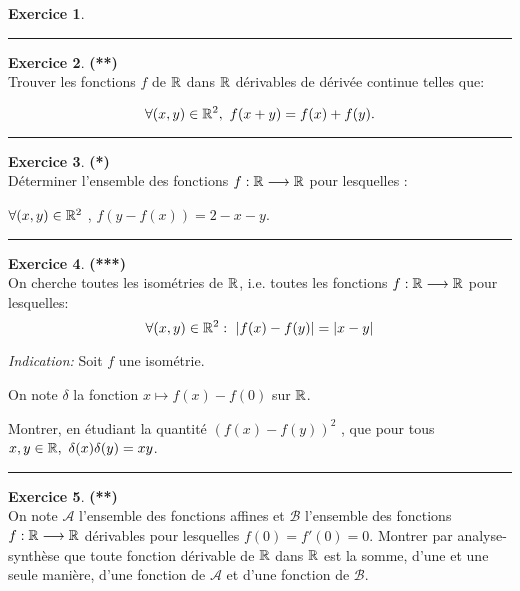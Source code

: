 \documentclass[a4paper,11pt]{article}
\theoremstyle{definition}
\newtheorem{exo}{Exercice} %
\begin{document}
\begin{minipage}{1\linewidth}
\begin{minipage}[t]{0.48\linewidth}
\begin{exo}
			\centering
			\rule{1\linewidth}{0.6pt}
		\end{exo}
		
		
			\begin{exo} \textbf{(**)}\quad\\[0.2cm]

			Trouver les fonctions $f$ de $\mathbb{R}$ dans $\mathbb{R}$ dérivables de dérivée continue telles que:
			
			
			$$\forall (x, y) \in \mathbb{R}^{2}, \ f(x+y) = f(x)+f(y).$$
			
			\centering
			\rule{1\linewidth}{0.6pt}
		\end{exo}
		
		
	\end{minipage}	
	\hfill\vrule\hfill
	\begin{minipage}[t]{0.48\linewidth}
		\raggedright
		
	
				\begin{exo}\textbf{(*)}\quad\\[0.2cm]
			
			Déterminer l'ensemble des fonctions $f : \mathbb{R} \longrightarrow \mathbb{R}$ pour lesquelles :
			
			$\forall (x, y) \in \mathbb{R}^2$ , $f(y-f(x)) = 2 - x - y$.
			\centering
			\rule{1\linewidth}{0.6pt}
		\end{exo}
	
		\begin{exo}\textbf{(***)}\quad\\[0.2cm]
			On cherche toutes les isométries de $\mathbb{R}$, i.e. toutes les fonctions $f : \mathbb{R} \longrightarrow \mathbb{R}$ pour lesquelles:
			$$\forall( x, y) \in \mathbb{R}^2 : \ |f(x) - f(y)| = |x - y|$$
			
			\textit{Indication:} Soit $f$ une isométrie. 
			
			On note $\delta$ la fonction $x \longmapsto f(x) - f(0)$ sur $\mathbb{R}$.
			
			
			Montrer, en étudiant la quantité $\left(f(x)- f(y)\right)^2$ , que pour tous $x, y \in \mathbb{R}, \ \delta(x) \delta(y) = x y$.
			
			\centering
			\rule{1\linewidth}{0.6pt}
		\end{exo}
		
		
		\begin{exo}\textbf{(**)}\quad\\[0.2cm]
			On note $\mathscr{A}$ l'ensemble des fonctions affines et
			$\mathscr{B}$ l'ensemble des fonctions $f : \mathbb{R} \longrightarrow \mathbb{R}$ dérivables
			pour lesquelles $f (0) = f' (0) = 0$. Montrer par analyse-synthèse que toute fonction dérivable de $\mathbb{R}$ dans $\mathbb{R}$ est la somme, d'une et une seule manière, d'une fonction de $\mathscr{A}$ et d'une fonction de $\mathscr{B}$.
			

\end{exo}
\end{minipage}
\end{minipage}
\end{document}
